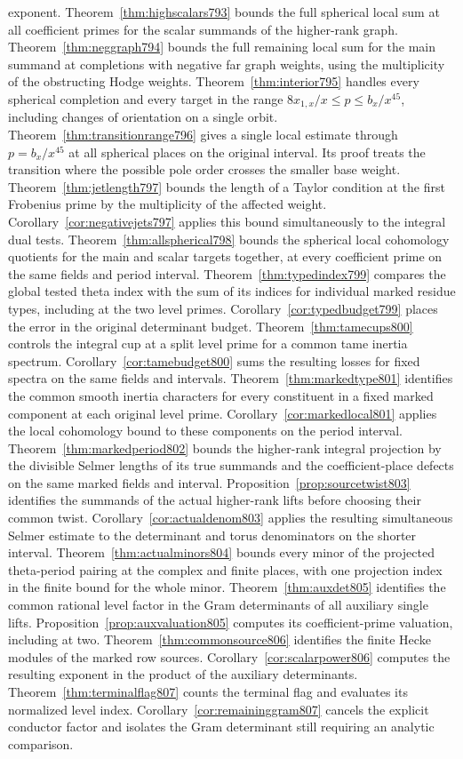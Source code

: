 \documentclass[a4paper,11pt]{article}
\theoremstyle{definition}
\theoremstyle{remark}
\numberwithin{equation}{section}
\begin{document}
exponent. Theorem~\ref{thm:highscalars793} bounds the full spherical local sum at all coefficient primes for the scalar summands of the higher-rank graph. Theorem~\ref{thm:neggraph794} bounds the full remaining local sum for the main summand at completions with negative far graph weights, using the multiplicity of the obstructing Hodge weights. Theorem~\ref{thm:interior795} handles every spherical completion and every target in the range \(8x_{1,x}/x\le p\le b_x/x^{45}\), including changes of orientation on a single orbit. Theorem~\ref{thm:transitionrange796} gives a single local estimate through \(p=b_x/x^{45}\) at all spherical places on the original interval. Its proof treats the transition where the possible pole order crosses the smaller base weight. Theorem~\ref{thm:jetlength797} bounds the length of a Taylor condition at the first Frobenius prime by the multiplicity of the affected weight. Corollary~\ref{cor:negativejets797} applies this bound simultaneously to the integral dual tests. Theorem~\ref{thm:allspherical798} bounds the spherical local cohomology quotients for the main and scalar targets together, at every coefficient prime on the same fields and period interval. Theorem~\ref{thm:typedindex799} compares the global tested theta index with the sum of its indices for individual marked residue types, including at the two level primes. Corollary~\ref{cor:typedbudget799} places the error in the original determinant budget. Theorem~\ref{thm:tamecups800} controls the integral cup at a split level prime for a common tame inertia spectrum. Corollary~\ref{cor:tamebudget800} sums the resulting losses for fixed spectra on the same fields and intervals. Theorem~\ref{thm:markedtype801} identifies the common smooth inertia characters for every constituent in a fixed marked component at each original level prime. Corollary~\ref{cor:markedlocal801} applies the local cohomology bound to these components on the period interval. Theorem~\ref{thm:markedperiod802} bounds the higher-rank integral projection by the divisible Selmer lengths of its true summands and the coefficient-place defects on the same marked fields and interval. Proposition~\ref{prop:sourcetwist803} identifies the summands of the actual higher-rank lifts before choosing their common twist. Corollary~\ref{cor:actualdenom803} applies the resulting simultaneous Selmer estimate to the determinant and torus denominators on the shorter interval. Theorem~\ref{thm:actualminors804} bounds every minor of the projected theta-period pairing at the complex and finite places, with one projection index in the finite bound for the whole minor. Theorem~\ref{thm:auxdet805} identifies the common rational level factor in the Gram determinants of all auxiliary single lifts. Proposition~\ref{prop:auxvaluation805} computes its coefficient-prime valuation, including at two. Theorem~\ref{thm:commonsource806} identifies the finite Hecke modules of the marked row sources. Corollary~\ref{cor:scalarpower806} computes the resulting exponent in the product of the auxiliary determinants. Theorem~\ref{thm:terminalflag807} counts the terminal flag and evaluates its normalized level index. Corollary~\ref{cor:remaininggram807} cancels the explicit conductor factor and isolates the Gram determinant still requiring an analytic comparison. 
\end{document}
